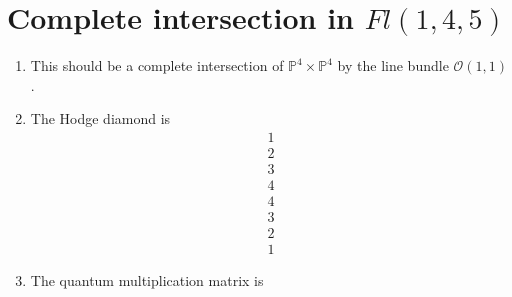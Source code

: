 \documentclass[11pt]{amsart}
\newcounter{num}[section] %
\begin{document}
\section{Complete intersection in $Fl(1,4,5)$}

\begin{enumerate}
\item[1)] This should be a complete intersection of $\mathbb{P}^4 \times \mathbb{P}^4$ by the line bundle $\mathcal{O}(1,1)$.
    \item [2)] The Hodge diamond is 
    \[
\begin{array}{c}
1\\
2\\
3\\
4\\
4\\
3\\
2\\
1
\end{array}
\]
    \item[3)] The quantum multiplication matrix is




\end{enumerate}
\end{document}
